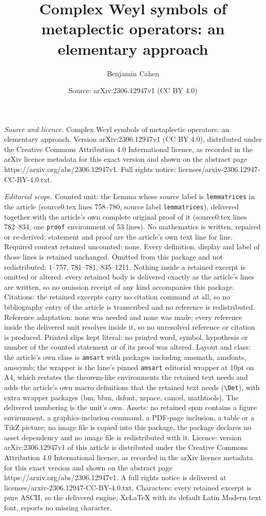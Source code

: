 \documentclass[10pt,a4paper]{amsart}
\title[Complex Weyl symbols of metaplectic operators: an elementary]{Complex Weyl symbols of metaplectic operators: an elementary approach}
\author{Benjamin Cahen}
\date{Source: arXiv:2306.12947v1 (CC BY 4.0)}
\begin{document}
\maketitle

\noindent\emph{Source and licence.} Complex Weyl symbols of metaplectic operators: an elementary approach. Version arXiv:2306.12947v1 (CC BY 4.0), distributed under the Creative Commons Attribution 4.0 International licence, as recorded in the arXiv licence metadata for this exact version and shown on the abstract page https://arxiv.org/abs/2306.12947v1. Full rights notice: licenses/arxiv-2306.12947-CC-BY-4.0.txt.\par\smallskip

\noindent\textit{Editorial scope.} Counted unit: the Lemma whose source label is \texttt{lemmatrices} in the article (source0.tex lines 758--780, source label \texttt{lemmatrices}), delivered together with the article's own complete original proof of it (source0.tex lines 782--834, one \texttt{proof} environment of 53 lines). No mathematics is written, repaired or re-derived: statement and proof are the article's own text line for line. Required context retained uncounted: none. Every definition, display and label of those lines is retained unchanged. Omitted from this package and not redistributed: 1--757, 781--781, 835--1211. Nothing inside a retained excerpt is omitted or altered: every retained body is delivered exactly as the article's lines are written, so no omission receipt of any kind accompanies this package. Citations: the retained excerpts carry no citation command at all, so no bibliography entry of the article is transcribed and no reference is redistributed. Reference adaptation: none was needed and none was made; every reference inside the delivered unit resolves inside it, so no unresolved reference or citation is produced. Printed slips kept literal: no printed word, symbol, hypothesis or number of the counted statement or of its proof was altered. Layout and class: the article's own class is \texttt{amsart} with packages including amsmath, amsfonts, amssymb; the wrapper is the lane's pinned \texttt{amsart} editorial wrapper at 10pt on A4, which restates the theorem-like environments the retained text needs and adds the article's own macro definitions that the retained text needs (\texttt{\textbackslash Det}), with extra wrapper packages (bm, bbm, dsfont, xspace, cancel, mathtools). The delivered numbering is the unit's own. Assets: no retained span contains a figure environment, a graphics-inclusion command, a PDF-page inclusion, a table or a TikZ picture; no image file is copied into this package, the package declares no asset dependency and no image file is redistributed with it. Licence: version arXiv:2306.12947v1 of this article is distributed under the Creative Commons Attribution 4.0 International licence, as recorded in the arXiv licence metadata for this exact version and shown on the abstract page https://arxiv.org/abs/2306.12947v1. A full rights notice is delivered at licenses/arxiv-2306.12947-CC-BY-4.0.txt. Characters: every retained excerpt is pure ASCII, so the delivered engine, XeLaTeX with its default Latin Modern text font, reports no missing character.
\end{document}
